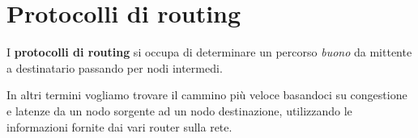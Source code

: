 \section{Protocolli di routing}
I \textbf{protocolli di routing} si occupa di determinare un percorso
\emph{buono} da mittente a destinatario passando per nodi intermedi.

In altri termini vogliamo trovare il cammino più veloce basandoci
su congestione e latenze da un nodo sorgente ad un nodo destinazione,
utilizzando le informazioni fornite dai vari router sulla rete.
